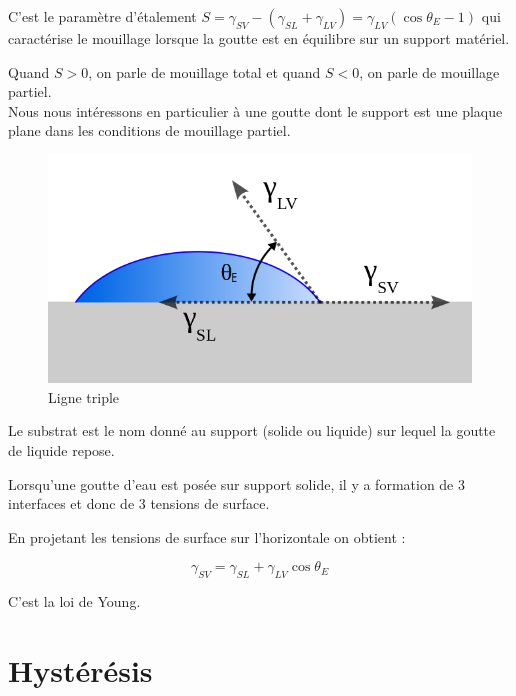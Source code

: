 C'est le paramètre d'étalement $S = \gamma_{SV} - (\gamma_{SL} + \gamma_{LV}) = \gamma_{LV}(\cos\theta_{E} - 1)$ qui caractérise le mouillage lorsque la goutte est en équilibre sur un support matériel.

Quand $S > 0$, on parle de mouillage total et quand $S < 0$, on parle de mouillage partiel.\\

Nous nous intéressons en particulier à une goutte dont le support est une plaque plane dans les conditions de mouillage partiel. 
\begin{figure}[ht]
	\centering
	\includegraphics[scale = 0.3]{./image/Contact_angle2.png}
	\caption{Ligne triple}
\end{figure}



Le substrat est le nom donné au support (solide ou liquide) sur lequel la goutte de liquide repose.

Lorsqu'une goutte d'eau est posée sur support solide, il y a formation de 3 interfaces et donc de 3 tensions de surface.


En projetant les tensions de surface sur l'horizontale on obtient :

\begin{equation}
	\label{eq:Young}
	\gamma_{SV}  = \gamma_{SL} + \gamma_{LV}\cos\theta_{E}
\end{equation}

C'est la loi de Young.

\section{Hystérésis}



